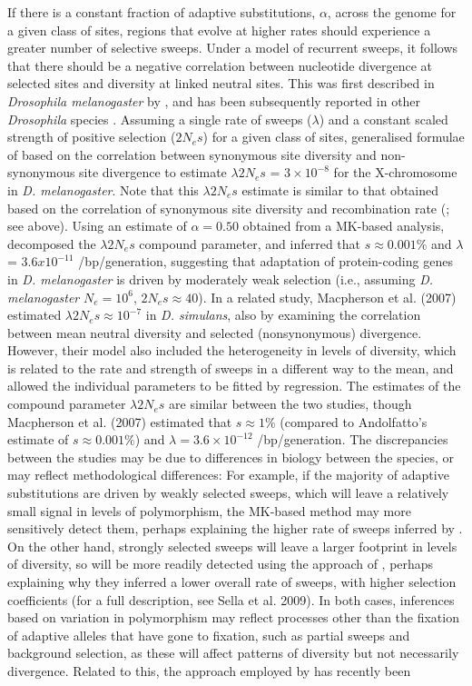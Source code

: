 If there is a constant fraction of adaptive substitutions, $\alpha$, across the genome for a given class of sites, regions that evolve at higher rates should experience a greater number of selective sweeps. Under a model of recurrent sweeps, it follows that there should be a negative correlation between nucleotide divergence at selected sites and diversity at linked neutral sites. This was first described in \textit{Drosophila melanogaster} by \cite{RN283}, and has been subsequently reported in other \textit{Drosophila} species \citep{RN284}. Assuming a single rate of sweeps ($\lambda$) and a constant scaled strength of positive selection ($2N_es$) for a given class of sites, \cite{RN283} generalised formulae of \cite{RN277} based on the correlation between synonymous site diversity and non-synonymous site divergence to estimate  $\lambda 2N_es$ = $3 \times 10^{-8}$ for the X-chromosome in \textit{D. melanogaster}. Note that this $\lambda 2N_es$ estimate is similar to that obtained based on the correlation of synonymous site diversity and recombination rate (\cite*{RN277}; see above). Using an estimate of $\alpha = 0.50$ obtained from a MK-based analysis, \cite{RN283} decomposed the $\lambda 2N_es$ compound parameter, and inferred that $s \approx 0.001\%$ and $\lambda$ = $3.6 x 10^{-11}$ /bp/generation, suggesting that adaptation of protein-coding genes in \textit{D. melanogaster} is driven by moderately weak selection (i.e., assuming \textit{D. melanogaster} $N_e =10^6$, $2N_es \approx 40$). In a related study, Macpherson et al. (2007) estimated $\lambda 2N_es \approx 10^{-7}$ in \textit{D. simulans}, also by examining the correlation between mean neutral diversity and selected (nonsynonymous) divergence. However, their model also included the heterogeneity in levels of diversity, which is related to the rate and strength of sweeps in a different way to the mean, and allowed the individual parameters to be fitted by regression. The estimates of the compound parameter $\lambda 2N_es$ are similar between the two studies, though Macpherson et al. (2007) estimated that $s \approx 1\%$ (compared to Andolfatto’s estimate of $s \approx 0.001 \%$) and $\lambda = 3.6 \times 10^{-12}$ /bp/generation. The discrepancies between the studies may be due to differences in biology between the species, or may reflect methodological differences: For example, if the majority of adaptive substitutions are driven by weakly selected sweeps, which will leave a relatively small signal in levels of  polymorphism, the MK-based method may more sensitively detect them, perhaps explaining the higher rate of sweeps inferred by \cite{RN283}. On the other hand, strongly selected sweeps will leave a larger footprint in levels of diversity, so will be more readily detected using the approach of \cite{RN289}, perhaps explaining why they inferred a lower overall rate of sweeps, with higher selection coefficients (for a full description, see Sella et al. 2009). In both cases, inferences based on variation in polymorphism may reflect processes other than the fixation of adaptive alleles that have gone to fixation, such as partial sweeps and background selection, as these will affect patterns of diversity but not necessarily divergence. Related to this, the approach employed by \cite{RN283} has recently been 